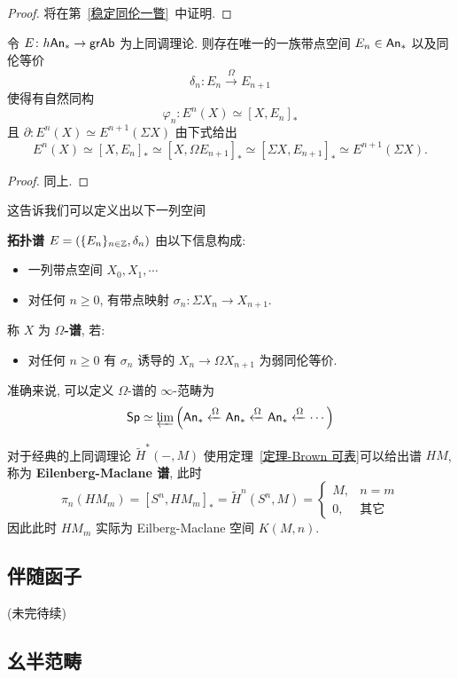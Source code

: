 \begin{proof}
    将在第~\ref{稳定同伦一瞥}~中证明.
\end{proof}
\begin{corollary}
    令 $E \colon h\mathsf{An}_* \to \mathsf{grAb}$ 为上同调理论. 则存在唯一的一族带点空间 $E_n \in \mathsf{An}_*$ 以及同伦等价
    \[
    \delta_n \colon E_n \xrightarrow{\Omega}E_{n+1}
    \]
    使得有自然同构
    \[
    \varphi_n \colon E^n(X) \simeq [X,E_n]_*
    \]
    且 $\partial \colon E^n(X) \simeq E^{n+1}(\Sigma X)$ 由下式给出
    \[
    E^n(X) \simeq [X,E_n]_* \simeq [X,\Omega E_{n+1}]_* \simeq [\Sigma X, E_{n+1}]_* \simeq E^{n+1}(\Sigma X).
    \]
\end{corollary}
\begin{proof}
    同上.
\end{proof}
这告诉我们可以定义出以下一列空间
\begin{definition}[拓扑谱]
    \textbf{拓扑谱} $E = (\{E_n\}_{n\in \mathbb{Z}}, \delta_n)$ 由以下信息构成:
    \begin{itemize}
        \item 一列带点空间 $X_0,X_1, \cdots$
        \item 对任何 $n \geq 0$, 有带点映射 $\sigma_n \colon \Sigma X_n \to X_{n+1}$.
    \end{itemize}
    称 $X$ 为 \textbf{$\Omega$-谱}, 若:
    \begin{itemize}
        \item 对任何 $n \geq 0$ 有 $\sigma_n$ 诱导的 $X_n \to \Omega X_{n+1}$ 为弱同伦等价.
    \end{itemize}
    准确来说, 可以定义 $\Omega$-谱的 $\infty$-范畴为
    \[
    \mathsf{Sp} \simeq \underleftarrow{\lim} \left(\mathsf{An}_* \xleftarrow{\Omega} \mathsf{An}_* \xleftarrow{\Omega}\mathsf{An}_* \xleftarrow{\Omega} \cdots\right)
    \]
\end{definition}
对于经典的上同调理论 $\tilde{H}^*(-,M)$ 使用定理~\ref{定理-Brown 可表}可以给出谱 $HM$, 称为 \textbf{Eilenberg-Maclane 谱}, 此时
\[
\pi_n(HM_m) = [S^n , HM_m]_* = \tilde{H}^n(S^n,M) = \left\{
\begin{array}{cc}
     M,& n=m \\
     0,& \text{其它} 
\end{array}\right.
\]
因此此时 $HM_m$ 实际为 Eilberg-Maclane 空间 $K(M,n)$.
\subsection{伴随函子}
(未完待续)
\subsection{幺半范畴}

